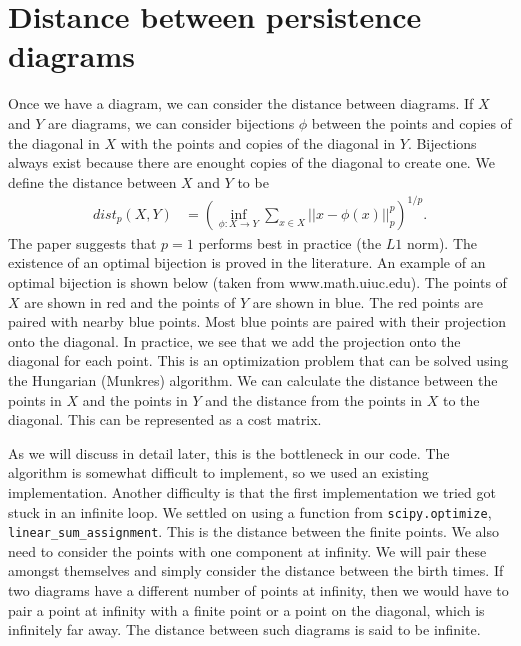 \documentclass[11pt]{amsart}
\begin{document}
\section{Distance between persistence diagrams}
Once we have a diagram, we can consider the distance between diagrams.  If $X$ and $Y$ are diagrams, we can consider bijections $\phi$ between the points and copies of the diagonal in $X$ with the points and copies of the diagonal in $Y$.  Bijections always exist because there are enought copies of the diagonal to create one.  We define the distance between $X$ and $Y$ to be
\begin{align}
dist_p(X,Y) &= \left(\inf_{\phi: X \to Y}\sum_{x \in X} ||x - \phi(x)||_p^p\right)^{1/p}.
\end{align}
The paper suggests that $p=1$ performs best in practice (the $L1$ norm).  The existence of an optimal bijection is proved in the literature.  An example of an optimal bijection is shown below (taken from www.math.uiuc.edu).  The points of $X$ are shown in red and the points of $Y$ are shown in blue.  The red points are paired with nearby blue points.  Most blue points are paired with their projection onto the diagonal.  In practice, we see that we add the projection onto the diagonal for each point.  This is an optimization problem that can be solved using the Hungarian (Munkres) algorithm.  We can calculate the distance between the points in $X$ and the points in $Y$ and the distance from the points in $X$ to the diagonal.  This can be represented as a cost matrix.  

As we will discuss in detail later, this is the bottleneck in our code.  The algorithm is somewhat difficult to implement, so we used an existing implementation.  Another difficulty is that the first implementation we tried got stuck in an infinite loop.  We settled on using a function from \texttt{scipy.optimize}, \texttt{linear\_sum\_assignment}.  This is the distance between the finite points.  We also need to consider the points with one component at infinity.  We will pair these amongst themselves and simply consider the distance between the birth times.  If two diagrams have a different number of points at infinity, then we would have to pair a point at infinity with a finite point or a point on the diagonal, which is infinitely far away.  The distance between such diagrams is said to be infinite.  
\end{document}
